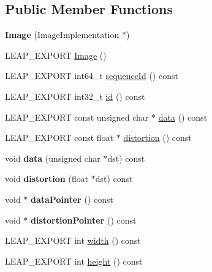 \subsection*{Public Member Functions}
\begin{DoxyCompactItemize}
\item 
\mbox{\label{class_leap_1_1_image_a6b549d1e77043cf9fc206257fc33d434}} 
{\bfseries Image} (Image\+Implementation $\ast$)
\item 
L\+E\+A\+P\+\_\+\+E\+X\+P\+O\+RT \hyperlink{class_leap_1_1_image_a7d92772968c52fd77332d2390533d6e5}{Image} ()
\item 
L\+E\+A\+P\+\_\+\+E\+X\+P\+O\+RT int64\+\_\+t \hyperlink{class_leap_1_1_image_a21a29c8d7006c741c72c496c673f90d5}{sequence\+Id} () const
\item 
L\+E\+A\+P\+\_\+\+E\+X\+P\+O\+RT int32\+\_\+t \hyperlink{class_leap_1_1_image_ab8a7baeb737b6f779d1ea47e0efaeb1d}{id} () const
\item 
L\+E\+A\+P\+\_\+\+E\+X\+P\+O\+RT const unsigned char $\ast$ \hyperlink{class_leap_1_1_image_ab5226d1ec47ce8a4bcebee7783112d22}{data} () const
\item 
L\+E\+A\+P\+\_\+\+E\+X\+P\+O\+RT const float $\ast$ \hyperlink{class_leap_1_1_image_ab36f9b712f7680c8fd8ae480655140bb}{distortion} () const
\item 
\mbox{\label{class_leap_1_1_image_a559c3ea338e8312817ce3c54944d769f}} 
void {\bfseries data} (unsigned char $\ast$dst) const
\item 
\mbox{\label{class_leap_1_1_image_ae1b0315825d8d9b5346d69af4e86ce3b}} 
void {\bfseries distortion} (float $\ast$dst) const
\item 
\mbox{\label{class_leap_1_1_image_a81f59c83b265d635d33fd515661374a3}} 
void $\ast$ {\bfseries data\+Pointer} () const
\item 
\mbox{\label{class_leap_1_1_image_a64904f5dea3af4c42882721a11c39372}} 
void $\ast$ {\bfseries distortion\+Pointer} () const
\item 
L\+E\+A\+P\+\_\+\+E\+X\+P\+O\+RT int \hyperlink{class_leap_1_1_image_adfca7fee0ab396da733d084946e1de0f}{width} () const
\item 
L\+E\+A\+P\+\_\+\+E\+X\+P\+O\+RT int \hyperlink{class_leap_1_1_image_aa0715444f45580442c65f707eacc77a9}{height} () const

\end{DoxyCompactItemize}
